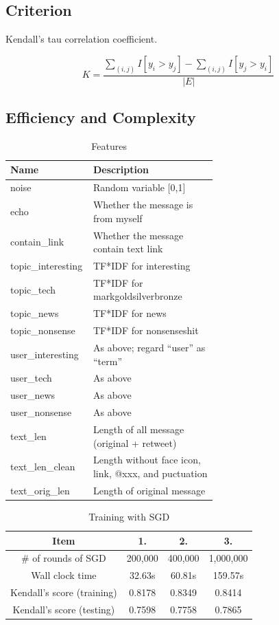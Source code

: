 \documentclass{sig-alternate}
\begin{document}
\subsection{Criterion}
\label{sec:Criterion}

Kendall's tau correlation coefficient. 

\begin{equation}
	K = \frac{\sum_{(i,j)}{I[y_i>y_j]} - \sum_{(i,j)}{I[y_j>y_i]}}{|E|}
\end{equation}

\subsection{Efficiency and Complexity}
\label{sec:Efficiency and Complexity}

\begin{table}[t!]
	\caption{Features}
	\centering
	\begin{tabular}{|l|p{0.6\linewidth}|}
		\hline
		Name & Description \\
		\hline
		noise & Random variable [0,1]\\
		echo & Whether the message is from myself\\
		contain\_link & Whether the message contain text link\\
		topic\_interesting & TF*IDF for {interesting}\\
		topic\_tech & TF*IDF for {mark}{gold}{silver}{bronze}\\
		topic\_news & TF*IDF for {news}\\
		topic\_nonsense & TF*IDF for {nonsense}{shit}\\
		user\_interesting & As above; regard ``user'' as ``term''\\
		user\_tech & As above\\
		user\_news & As above\\
		user\_nonsense & As above\\
		text\_len & Length of all message (original + retweet)\\
		text\_len\_clean & Length without face icon, link, @xxx, and puctuation\\
		text\_orig\_len & Length of original message\\
		\hline
	\end{tabular}
\end{table}

\begin{table}
	\centering
	\caption{Training with SGD}
	\begin{tabular}{|c|c|c|c|}
	\hline
	Item & 1. & 2. & 3. \\
	\hline
	\# of rounds of SGD & 200,000 & 400,000 & 1,000,000\\
	Wall clock time & 32.63s & 60.81s & 159.57s\\
	Kendall's score (training) & 0.8178 & 0.8349 & 0.8414\\
	Kendall's score (testing) & 0.7598 & 0.7758 & 0.7865\\
	\hline
	\end{tabular}
\end{table}
\end{document}
